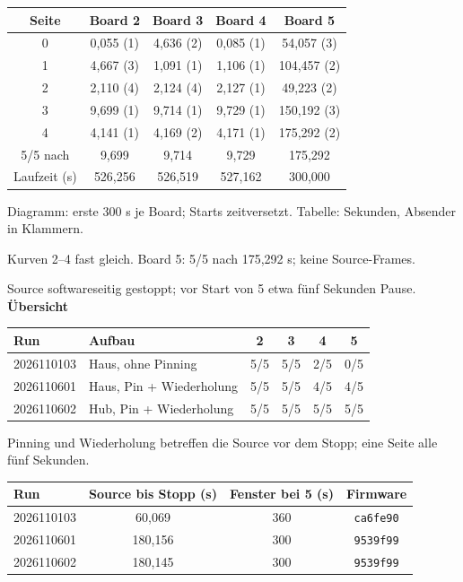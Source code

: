 \documentclass[a4paper,11pt]{article}
\begin{document}
\begin{center}\small
\begin{tabular}{ccccc}\toprule
Seite & Board 2 & Board 3 & Board 4 & Board 5 \\ \midrule
0 & 0,055 (1) & 4,636 (2) & 0,085 (1) & 54,057 (3) \\
1 & 4,667 (3) & 1,091 (1) & 1,106 (1) & 104,457 (2) \\
2 & 2,110 (4) & 2,124 (4) & 2,127 (1) & 49,223 (2) \\
3 & 9,699 (1) & 9,714 (1) & 9,729 (1) & 150,192 (3) \\
4 & 4,141 (1) & 4,169 (2) & 4,171 (1) & 175,292 (2) \\
\midrule
5/5 nach & 9,699 & 9,714 & 9,729 & 175,292 \\
Laufzeit (s) & 526,256 & 526,519 & 527,162 & 300,000 \\
\bottomrule\end{tabular}
\end{center}

{\small Diagramm: erste 300 s je Board; Starts zeitversetzt. Tabelle: Sekunden, Absender in Klammern.}

{\small Kurven 2--4 fast gleich. Board 5: 5/5 nach 175,292 s; keine Source-Frames.}

{\small Source softwareseitig gestoppt; vor Start von 5 etwa fünf Sekunden Pause.}
\newpage\textbf{Übersicht}

\begin{center}\small
\begin{tabular}{llcccc}\toprule
Run & Aufbau & 2 & 3 & 4 & 5 \\ \midrule
2026110103 & Haus, ohne Pinning & 5/5 & 5/5 & 2/5 & 0/5 \\
2026110601 & Haus, Pin + Wiederholung & 5/5 & 5/5 & 4/5 & 4/5 \\
2026110602 & Hub, Pin + Wiederholung & 5/5 & 5/5 & 5/5 & 5/5 \\
\bottomrule\end{tabular}
\end{center}

{\small Pinning und Wiederholung betreffen die Source vor dem Stopp; eine Seite alle fünf Sekunden.}

\begin{center}\small
\begin{tabular}{lccc}\toprule
Run & Source bis Stopp (s) & Fenster bei 5 (s) & Firmware \\ \midrule
2026110103 & 60,069 & 360 & \texttt{ca6fe90} \\
2026110601 & 180,156 & 300 & \texttt{9539f99} \\
2026110602 & 180,145 & 300 & \texttt{9539f99} \\
\bottomrule\end{tabular}
\end{center}
\end{document}
